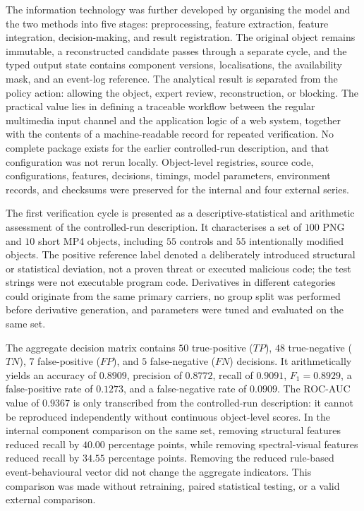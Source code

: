 The information technology was further developed by organising the model and the two methods into five stages: preprocessing, feature extraction, feature integration, decision-making, and result registration. The original object remains immutable, a reconstructed candidate passes through a separate cycle, and the typed output state contains component versions, localisations, the availability mask, and an event-log reference. The analytical result is separated from the policy action: allowing the object, expert review, reconstruction, or blocking. The practical value lies in defining a traceable workflow between the regular multimedia input channel and the application logic of a web system, together with the contents of a machine-readable record for repeated verification. No complete package exists for the earlier controlled-run description, and that configuration was not rerun locally. Object-level registries, source code, configurations, features, decisions, timings, model parameters, environment records, and checksums were preserved for the internal and four external series.

The first verification cycle is presented as a descriptive-statistical and arithmetic assessment of the controlled-run description. It characterises a set of $100$ PNG and $10$ short MP4 objects, including $55$ controls and $55$ intentionally modified objects. The positive reference label denoted a deliberately introduced structural or statistical deviation, not a proven threat or executed malicious code; the test strings were not executable program code. Derivatives in different categories could originate from the same primary carriers, no group split was performed before derivative generation, and parameters were tuned and evaluated on the same set.

The aggregate decision matrix contains $50$ true-positive ($TP$), $48$ true-negative ($TN$), $7$ false-positive ($FP$), and $5$ false-negative ($FN$) decisions. It arithmetically yields an accuracy of $0.8909$, precision of $0.8772$, recall of $0.9091$, $F_1=0.8929$, a false-positive rate of $0.1273$, and a false-negative rate of $0.0909$. The ROC-AUC value of $0.9367$ is only transcribed from the controlled-run description: it cannot be reproduced independently without continuous object-level scores. In the internal component comparison on the same set, removing structural features reduced recall by $40.00$ percentage points, while removing spectral-visual features reduced recall by $34.55$ percentage points. Removing the reduced rule-based event-behavioural vector did not change the aggregate indicators. This comparison was made without retraining, paired statistical testing, or a valid external comparison.

